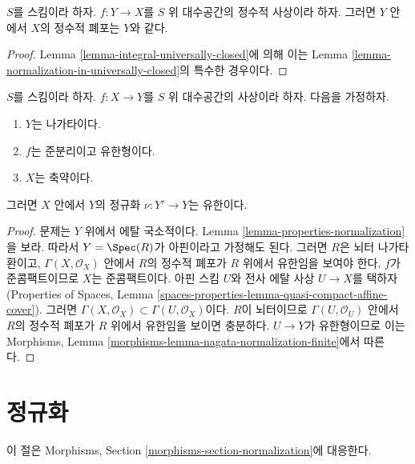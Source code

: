 \begin{lemma}
\label{lemma-normalization-in-integral}
$S$를 스킴이라 하자. $f : Y \to X$를 $S$ 위 대수공간의 정수적 사상이라
하자. 그러면 $Y$ 안에서 $X$의 정수적 폐포는 $Y$와 같다.
\end{lemma}

\begin{proof}
Lemma \ref{lemma-integral-universally-closed}에 의해 이는 Lemma
\ref{lemma-normalization-in-universally-closed}의 특수한 경우이다.
\end{proof}

\begin{lemma}
\label{lemma-nagata-normalization-finite}
$S$를 스킴이라 하자. $f : X \to Y$를 $S$ 위 대수공간의 사상이라 하자.
다음을 가정하자.
\begin{enumerate}
\item $Y$는 나가타이다.
\item $f$는 준분리이고 유한형이다.
\item $X$는 축약이다.
\end{enumerate}
그러면 $X$ 안에서 $Y$의 정규화 $\nu : Y' \to Y$는 유한이다.
\end{lemma}

\begin{proof}
문제는 $Y$ 위에서 에탈 국소적이다. Lemma
\ref{lemma-properties-normalization}을 보라. 따라서
$Y = \Spec(R)$가 아핀이라고 가정해도 된다. 그러면 $R$은 뇌터 나가타
환이고, $\Gamma(X, \mathcal{O}_X)$ 안에서 $R$의 정수적 폐포가 $R$ 위에서
유한임을 보여야 한다. $f$가 준콤팩트이므로 $X$는 준콤팩트이다.
아핀 스킴 $U$와 전사 에탈 사상 $U \to X$를 택하자(Properties of
Spaces, Lemma
\ref{spaces-properties-lemma-quasi-compact-affine-cover}). 그러면
$\Gamma(X, \mathcal{O}_X) \subset \Gamma(U, \mathcal{O}_X)$이다.
$R$이 뇌터이므로 $\Gamma(U, \mathcal{O}_U)$ 안에서 $R$의 정수적 폐포가
$R$ 위에서 유한임을 보이면 충분하다. $U \to Y$가 유한형이므로 이는
Morphisms, Lemma
\ref{morphisms-lemma-nagata-normalization-finite}에서 따른다.
\end{proof}

\section{정규화}
\label{section-normalization}

\noindent
이 절은 Morphisms, Section \ref{morphisms-section-normalization}에
대응한다.


